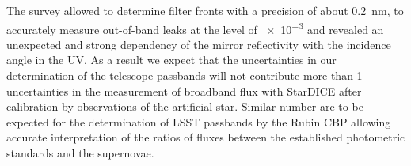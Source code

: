 The survey allowed to determine filter fronts with a precision of
about 0.2~nm, to accurately measure out-of-band leaks at the level of
\num{e-3} and revealed an unexpected and strong dependency of the
mirror reflectivity with the incidence angle in the UV. As a result we
expect that the uncertainties in our determination of the telescope
passbands will not contribute more than 1\textperthousand
uncertainties in the measurement of broadband flux with StarDICE after
calibration by observations of the artificial star. Similar number are
to be expected for the determination of LSST passbands by the Rubin
CBP allowing accurate interpretation of the ratios of fluxes between
the established photometric standards and the supernovae.

